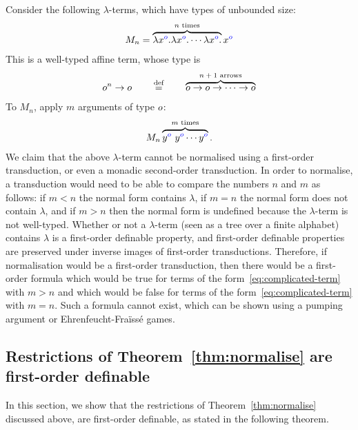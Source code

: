\begin{example}\label{ex:affine-not-enough}
Consider the following $\lambda$-terms, which have types of 
unbounded size: 
\begin{align*}
M_n = \overbrace{\lambda {x}^{{\color{blue}o}}. \lambda {x}^{{\color{blue}o}}. \cdots \lambda {x}^{{\color{blue}o}}.}^{\text{$n$ times}} {x}^{{\color{blue}o}}
\end{align*}
This is a well-typed affine term, whose type is 
\begin{align*}
o^n \to o \qquad \stackrel{\text{def}}= \qquad  \overbrace{o \to o \to \cdots \to o}^{\text{$n+1$ arrows}}
\end{align*}
    To $M_n$, apply  $m$ arguments of type $o$:
    \begin{align}\label{eq:complicated-term}
    M_n \overbrace{{y}^{{\color{blue}o}} \ {y}^{{\color{blue}o}} \cdots {y}^{{\color{blue}o}} }^{\text{$m$ times}}.
    \end{align}
    We claim that the above $\lambda$-term cannot be normalised using a first-order transduction, or even a monadic second-order transduction. In order to normalise, a transduction would need to be able to compare the numbers $n$ and $m$ as follows:  if $m < n$  the normal form contains $\lambda$, if $m=n$  the normal form does not contain $\lambda$, and if $m > n$ then the normal form is undefined because the $\lambda$-term is not well-typed.  Whether or not a $\lambda$-term (seen as a tree over a finite alphabet) contains $\lambda$ is a first-order definable property, and first-order definable properties are preserved under inverse images of first-order transductions. Therefore, if normalisation would be a first-order transduction,
then there would be a first-order formula which would be true for terms of the form~\eqref{eq:complicated-term} with $m>n$ and which would be false for terms of the form~\eqref{eq:complicated-term} with $m=n$. Such a formula cannot exist, which can be shown using a pumping argument or Ehrenfeucht-Fra\"iss\'e games. 
\end{example}

\subsection{Restrictions of Theorem~\ref{thm:normalise} are first-order definable} \label{sec:restrictions-are-fo}

In this section, we show that the restrictions of Theorem~\ref{thm:normalise} discussed above, are first-order definable, as stated in the following theorem.

